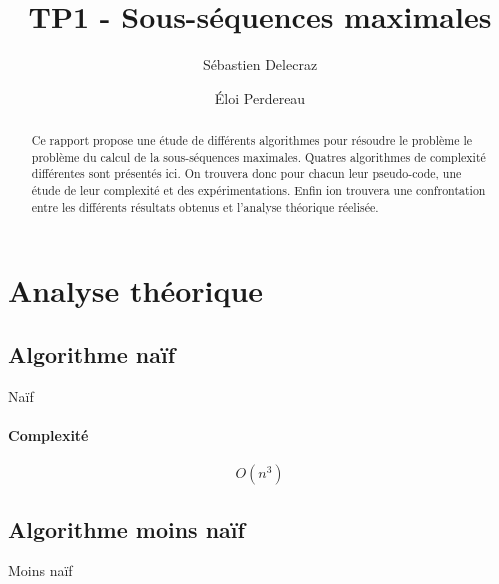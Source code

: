 \documentclass[11pt, a4paper]{article}
\title{TP1 - Sous-séquences maximales}
\author{Sébastien Delecraz \and \'Eloi Perdereau}
\begin{document}
\maketitle

\begin{abstract}
  Ce rapport propose une étude de différents algorithmes pour résoudre le
  problème le problème du calcul de la sous-séquences maximales. Quatres
  algorithmes de complexité différentes sont présentés ici. On trouvera donc
  pour chacun leur pseudo-code, une étude de leur complexité et des
  expérimentations. Enfin ion trouvera une confrontation entre les différents
  résultats obtenus et l'analyse théorique réelisée.
\end{abstract}

\section{Analyse théorique}

\subsection{Algorithme naïf}

\begin{algorithm}
\caption{Naïf}
\end{algorithm}
\paragraph{Complexité}
\[O(n^3)\]

\subsection{Algorithme moins naïf}

\begin{algorithm}
\caption{Moins naïf}
\end{algorithm}
\end{document}
